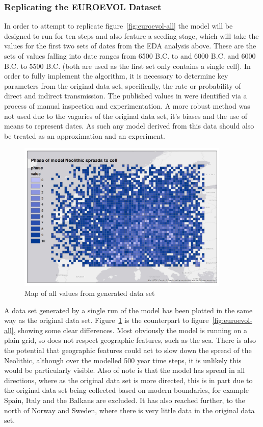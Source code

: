 \subsubsection{Replicating the EUROEVOL Dataset}
In order to attempt to replicate figure~\ref{fig:euroevol-all} the model will be designed to run for ten steps and also feature a seeding stage, which will take the values for the first two sets of dates from the EDA analysis above. These are the sets of values falling into date ranges from 6500 B.C. to and 6000 B.C. and 6000 B.C. to 5500 B.C. (both are used as the first set only contains a single cell). In order to fully implement the algorithm, it is necessary to determine key parameters from the original data set, specifically, the rate or probability of direct and indirect transmission. The published values in \citet{doug_cowie_2018_1297319} were identified via a process of manual inspection and experimentation. A more robust method was not used due to the vagaries of the original data set, it's biases and the use of means to represent dates. As such any model derived from this data should also be treated as an approximation and an experiment.

\begin{figure}
\begin{center}
	\includegraphics[width=0.9\textwidth]{figures/model-all}
\end{center}
  \caption{Map of all values from generated data set}
  \label{fig:model-all}
\end{figure}

A data set generated by a single run of the model has been plotted in the same way as the original data set. Figure~\ref{fig:model-all} is the counterpart to figure~\ref{fig:euroevol-all}, showing some clear differences. Most obviously the model is running on a plain grid, so does not respect geographic features, such as the sea. There is also the potential that geographic features could act to slow down the spread of the Neolithic, although over the modelled 500 year time steps, it is unlikely this would be particularly visible. Also of note is that the model has spread in all directions, where as the original data set is more directed, this is in part due to the original data set being collected based on modern boundaries, for example Spain, Italy and the Balkans are excluded. It has also reached further, to the north of Norway and Sweden, where there is very little data in the original data set. 

